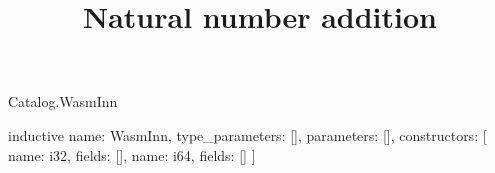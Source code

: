 \begin{lexlean}{Catalog.WasmInn}
\title{Natural number addition}
\begin{semanticmodule}
inductive{
  name: WasmInn,
  type_parameters: [],
  parameters: [],
  constructors: [
    {name: i32, fields: []},
    {name: i64, fields: []}
  ]
}
\end{semanticmodule}
\end{lexlean}
